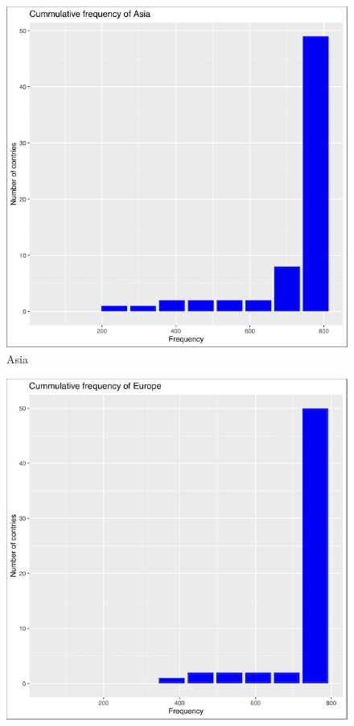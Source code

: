 \documentclass[a4paper]{article}
\theoremstyle{definition}
\begin{document}
\begin{enumerate}[i)]
\begin{enumerate}[1]
\begin{figure}[H]
				\includegraphics[scale=0.8]{images/4.1.2.png}
				\vspace{5mm}
				\caption{Asia}
			\end{figure}
		\begin{figure}[H]
			\centering
			\includegraphics[scale=0.8]{images/4.1.3.png}

\end{figure}
\end{enumerate}
\end{enumerate}
\end{document}
